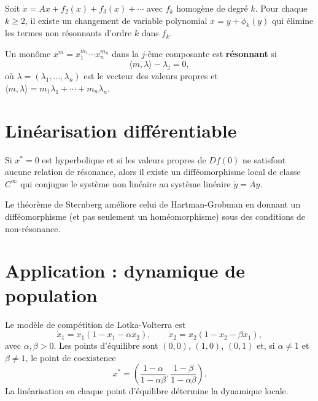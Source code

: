 \begin{theoreme}
Soit $\dot{x} = Ax + f_2(x) + f_3(x) + \cdots$ avec $f_k$ homog\`ene de
degr\'e $k$. Pour chaque $k \geq 2$, il existe un changement de variable
polynomial $x = y + \phi_k(y)$ qui \'elimine les termes non r\'esonnants
d'ordre $k$ dans $f_k$.
\end{theoreme}

\begin{definition}[R\'esonance]
Un mon\^ome $x^m = x_1^{m_1} \cdots x_n^{m_n}$ dans la $j$-\`eme composante
est \textbf{r\'esonnant} si
\[
    \langle m, \lambda \rangle - \lambda_j = 0,
\]
o\`u $\lambda = (\lambda_1, \ldots, \lambda_n)$ est le vecteur des valeurs
propres et $\langle m, \lambda \rangle = m_1\lambda_1 + \cdots + m_n\lambda_n$.
\end{definition}

\section{Lin\'earisation diff\'erentiable}

\begin{theoreme}[Sternberg]
Si $x^* = 0$ est hyperbolique et si les valeurs propres de $Df(0)$ ne
satisfont aucune relation de r\'esonance, alors il existe un
diff\'eomorphisme local de classe $C^\infty$ qui conjugue le syst\`eme
non lin\'eaire au syst\`eme lin\'eaire $\dot{y} = Ay$.
\end{theoreme}

\begin{remarque}
Le th\'eor\`eme de Sternberg am\'eliore celui de Hartman-Grobman en donnant
un diff\'eomorphisme (et pas seulement un hom\'eomorphisme) sous des
conditions de non-r\'esonance.
\end{remarque}

\section{Application : dynamique de population}

\begin{exemple}
Le mod\`ele de comp\'etition de Lotka-Volterra est
\[
    \dot{x}_1 = x_1(1 - x_1 - \alpha x_2), \qquad
    \dot{x}_2 = x_2(1 - x_2 - \beta x_1),
\]
avec $\alpha, \beta > 0$. Les points d'\'equilibre sont $(0,0)$, $(1,0)$,
$(0,1)$ et, si $\alpha \neq 1$ et $\beta \neq 1$, le point de coexistence
\[
    x^* = \left(\frac{1-\alpha}{1-\alpha\beta}, \frac{1-\beta}{1-\alpha\beta}\right).
\]
La lin\'earisation en chaque point d'\'equilibre d\'etermine la dynamique locale.
\end{exemple}

